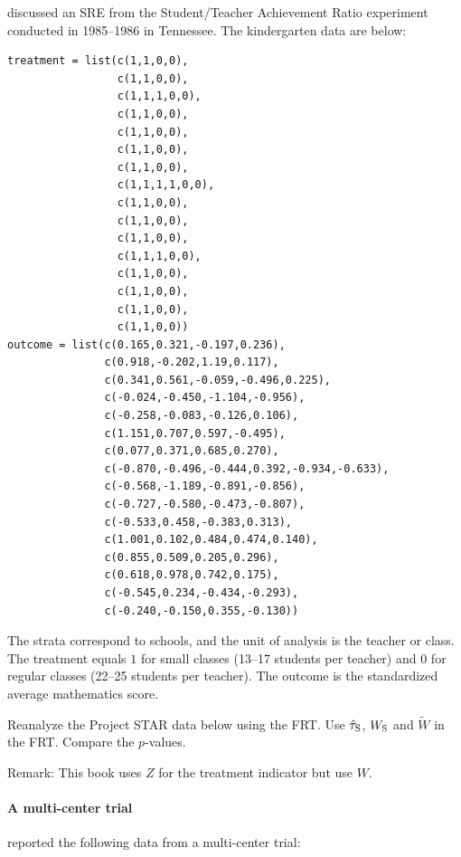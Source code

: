 \citet{imbens2015causal} discussed an SRE from the Student/Teacher Achievement Ratio experiment conducted in 1985--1986 in Tennessee. 
The kindergarten data are below:
 \begin{lstlisting}
treatment = list(c(1,1,0,0), 
                 c(1,1,0,0), 
                 c(1,1,1,0,0), 
                 c(1,1,0,0),
                 c(1,1,0,0),
                 c(1,1,0,0),
                 c(1,1,0,0), 
                 c(1,1,1,1,0,0),
                 c(1,1,0,0),
                 c(1,1,0,0),
                 c(1,1,0,0),
                 c(1,1,1,0,0),
                 c(1,1,0,0),
                 c(1,1,0,0),
                 c(1,1,0,0),
                 c(1,1,0,0))
outcome = list(c(0.165,0.321,-0.197,0.236), 
               c(0.918,-0.202,1.19,0.117),
               c(0.341,0.561,-0.059,-0.496,0.225),
               c(-0.024,-0.450,-1.104,-0.956), 
               c(-0.258,-0.083,-0.126,0.106),
               c(1.151,0.707,0.597,-0.495), 
               c(0.077,0.371,0.685,0.270), 
               c(-0.870,-0.496,-0.444,0.392,-0.934,-0.633), 
               c(-0.568,-1.189,-0.891,-0.856), 
               c(-0.727,-0.580,-0.473,-0.807), 
               c(-0.533,0.458,-0.383,0.313), 
               c(1.001,0.102,0.484,0.474,0.140), 
               c(0.855,0.509,0.205,0.296), 
               c(0.618,0.978,0.742,0.175), 
               c(-0.545,0.234,-0.434,-0.293), 
               c(-0.240,-0.150,0.355,-0.130))
\end{lstlisting}
The strata correspond to schools, and the unit of analysis is the teacher or class. The treatment equals $1$ for small classes (13--17 students per teacher) and $0$ for regular classes (22--25 students per teacher). The outcome is the standardized average mathematics score.


Reanalyze the Project STAR data below using the FRT.  Use $\hat{\tau}_\textsc{S}$, $W_\textsc{S}$ and $\tilde W$ in the FRT. Compare the $p$-values.

Remark: This book uses $Z$ for the treatment indicator but \citet{imbens2015causal} use $W.$
 






\paragraph{A multi-center trial}

\citet[][Table 1]{gould1998multi} reported the following data from a multi-center trial:

